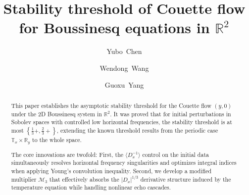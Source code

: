 \documentclass[reqno, 12pt]{amsart} %
\theoremstyle{plain} %
\theoremstyle{definition}
\theoremstyle{remark}
\numberwithin{equation}{section} %
\begin{document}
	
	\title[Stability threshold of the Couette flow for Boussinesq equation]{Stability threshold of Couette flow for  Boussinesq equations in $\mathbb{R}^2$}	
	\author{Yubo~Chen}
	\address[Yubo~Chen]{School of Mathematical Sciences, Dalian University of Technology, Dalian, 116024,  China}
	
	\author{Wendong~Wang}
	\address[Wendong~Wang]{School of Mathematical Sciences, Dalian University of Technology, Dalian, 116024,  China}
	
	\author{Guoxu~Yang}
	\address[Guoxu~Yang]{School of Mathematical Sciences, Dalian University of Technology, Dalian, 116024,  China}
	\begin{abstract}
		
		This paper establishes the asymptotic stability threshold for the Couette flow $(y,0)$ under the 2D Boussinesq system in $\mathbb{R}^2$. 
		It was proved that for initial perturbations in Sobolev spaces with controlled low horizontal frequencies, 
		the stability threshold is at most $\left\{\frac{1}{3}+, \frac{2}{3}+\right\}$, extending the known threshold results from the periodic case $\mathbb{T}_x \times \mathbb{R}_y$ to the whole space. 
		
		The core innovations are twofold: First, the $\langle D_x^{-1} \rangle$ control on the initial data simultaneously resolves horizontal frequency singularities and optimizes integral indices when applying Young's convolution inequality. 
		Second, we develop a modified multiplier $\mathcal{M}_3$ that effectively absorbs the $|D_x|^{1/3}$ derivative structure induced by the temperature equation while handling nonlinear echo cascades. 
	\end{abstract}
	
\end{document}
